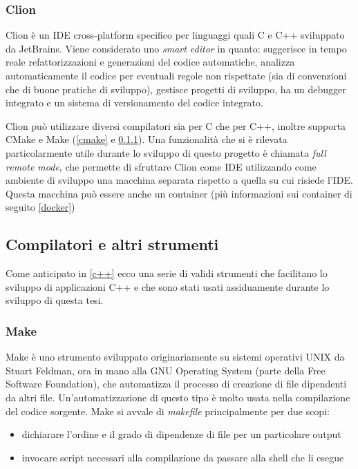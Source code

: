         \subsubsection{Clion}\label{clion}
        Clion è un IDE cross-platform specifico per linguaggi quali C e C++ sviluppato da JetBrains. Viene considerato uno \textit{smart editor} in
        quanto: suggerisce in tempo reale refattorizzazioni e generazioni del codice automatiche, analizza automaticamente
        il codice per eventuali regole non rispettate (sia di convenzioni che di buone pratiche di sviluppo), gestisce
        progetti di sviluppo, ha un debugger integrato e un sistema di versionamento del codice integrato.

        Clion può utilizzare diversi compilatori sia per C che per C++, inoltre supporta CMake e Make (\ref*{cmake} e \ref*{make}).
        Una funzionalità che si è rilevata particolarmente utile durante lo sviluppo di questo progetto è chiamata
        \textit{full remote mode}, che permette di sfruttare Clion come IDE utilizzando come ambiente di sviluppo una macchina
        separata rispetto a quella su cui risiede l'IDE. Questa macchina può essere anche un container (più informazioni sui container di seguito \ref*{docker})
    \subsection{Compilatori e altri strumenti}
    Come anticipato in \ref*{c++} ecco una serie di validi strumenti che facilitano lo sviluppo di applicazioni C++ e che sono
    stati usati assiduamente durante lo sviluppo di questa tesi.

        \subsubsection{Make}\label{make}
        Make è uno strumento sviluppato originariamente su sistemi operativi UNIX da Stuart Feldman, ora
        in mano alla GNU Operating System (parte della Free Software Foundation), che automatizza il
        processo di creazione di file dipendenti da altri file. Un'automatizzazione di questo tipo è
        molto usata nella compilazione del codice sorgente. Make si avvale di \textit{makefile} principalmente
        per due scopi:
         \begin{itemize}
             \item dichiarare l'ordine e il grado di dipendenze di file per un particolare output
             \item invocare script necessari alla compilazione da passare alla shell che li esegue
         \end{itemize}

